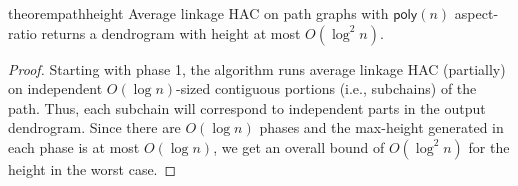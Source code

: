 \documentclass[11pt]{article}
\newcommand{\poly}{\ensuremath{\mathsf{poly}}}
\begin{document}
\begin{restatable}{theorem}{pathheight}\label{thm:pathheight}
    Average linkage HAC on path graphs with $\poly(n)$ aspect-ratio returns a dendrogram with height at most $O(\log^2n)$.
\end{restatable}

\begin{proof}
    Starting with phase 1, the algorithm runs average linkage HAC (partially) on independent $O(\log n)$-sized contiguous portions (i.e., subchains) of the path. Thus, each subchain will correspond to independent parts in the output dendrogram. Since there are $O(\log n)$ phases and the max-height generated in each phase is at most $O(\log n)$, we get an overall bound of $O(\log^2n)$ for the height in the worst case.
\end{proof}

\end{document}
